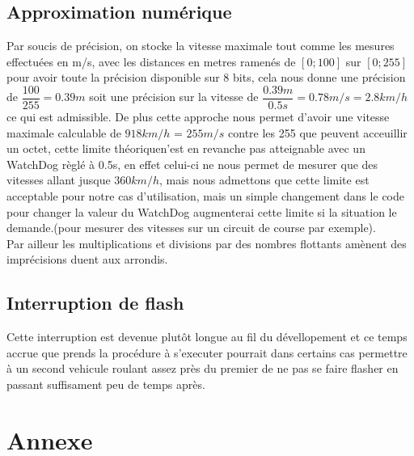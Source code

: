 \documentclass[a4paper, 12pt]{article}
\begin{document}
		\subsection{Approximation numérique}
		Par soucis de précision, on stocke la vitesse maximale tout comme les mesures effectuées en m/s, avec les distances en metres ramenés de $[0;100]$ sur $[0;255]$ pour avoir toute la précision disponible sur 8 bits, cela nous donne une précision de $\dfrac{100}{255} = 0.39m$ soit une précision sur la vitesse de $\dfrac{0.39m}{0.5s} = 0.78m/s = 2.8 km/h$ ce qui est admissible. De plus cette approche nous permet d'avoir une vitesse maximale calculable de $918km/h$ = $255m/s$ contre les 255 que peuvent acceuillir un octet, cette limite théoriquen'est en revanche pas atteignable avec un WatchDog règlé à 0.5s, en effet celui-ci ne nous permet de mesurer que des vitesses allant jusque $360km/h$, mais nous admettons que cette limite est acceptable pour notre cas d'utilisation, mais un simple changement dans le code pour changer la valeur du WatchDog augmenterai cette limite si la situation le demande.(pour mesurer des vitesses sur un circuit de course par exemple).\\
 		Par ailleur les multiplications et divisions par des nombres flottants amènent des imprécisions duent aux arrondis.
		
		\subsection{Interruption de flash}
		Cette interruption est devenue plutôt longue au fil du dévellopement et ce temps accrue que prends la procédure à s'executer pourrait dans certains cas permettre à un second vehicule roulant assez près du premier de ne pas se faire flasher en passant suffisament peu de temps après.
		
		\newpage
		\section{Annexe}
\end{document}
